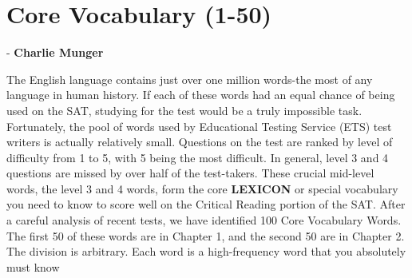 \documentclass{book}
\begin{document}
\chapter{Core Vocabulary (1-50)}

\hfill - \textbf{Charlie Munger}

The English language contains just over one million words-the most of any language in human history. If each of these words had an equal chance of being used on the SAT, studying for the test would be a truly impossible task. Fortunately, the pool of words used by Educational Testing Service (ETS) test writers is actually relatively small. Questions on the test are ranked by level of difficulty from 1 to 5, with 5 being the most difficult. In general, level 3 and 4 questions are missed by over half of the test-takers. These crucial mid-level words, the level 3 and 4 words, form the core \textbf{LEXICON} or special vocabulary you need to know to score well on the Critical Reading portion of the SAT. After a careful analysis of recent tests, we have identified 100 Core Vocabulary Words. The first 50 of these words are in Chapter 1, and the second 50 are in Chapter 2. The division is arbitrary. Each word is a high-frequency word that you absolutely must know
\end{document}
